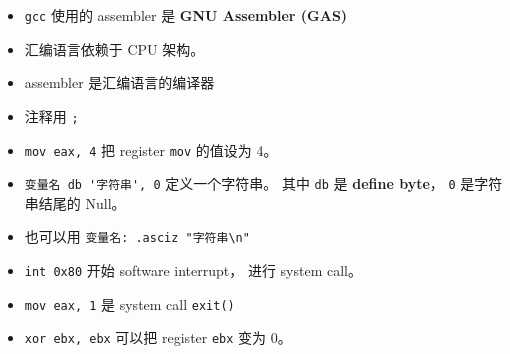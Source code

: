 
\begin{issues}
\issueDraft
\end{issues}

\begin{itemize}
\item \verb|gcc| 使用的 assembler 是 \textbf{GNU Assembler (GAS)}
\item 汇编语言依赖于 CPU 架构。
\item assembler 是汇编语言的编译器
\item 注释用 \verb|;|
\item \verb|mov eax, 4| 把 register \verb|mov| 的值设为 4。
\item \verb|变量名 db '字符串', 0| 定义一个字符串。 其中 \verb|db| 是 \textbf{define byte}， \verb|0| 是字符串结尾的 Null。
\item 也可以用 \verb|变量名: .asciz "字符串\n"|
\item \verb|int 0x80| 开始 software interrupt， 进行 system call。
\item \verb|mov eax, 1| 是 system call \verb|exit()|
\item \verb|xor ebx, ebx| 可以把 register \verb|ebx| 变为 0。
\end{itemize}

